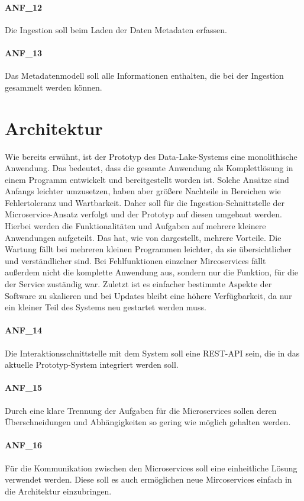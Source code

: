 \paragraph{ANF\_12}
\label{ANF_12}
Die Ingestion soll beim Laden der Daten Metadaten erfassen.

\paragraph{ANF\_13}
\label{ANF_13}
Das Metadatenmodell soll alle Informationen enthalten, die bei der Ingestion gesammelt werden können.

\section{Architektur}
\label{sec:anf-arch}
Wie bereits erwähnt, ist der Prototyp des Data-Lake-Systems eine monolithische Anwendung.
Das bedeutet, dass die gesamte Anwendung als Komplettlösung in einem Programm entwickelt und bereitgestellt worden ist.
Solche Ansätze sind Anfangs leichter umzusetzen, haben aber größere Nachteile in Bereichen wie Fehlertoleranz und Wartbarkeit.
Daher soll für die Ingestion-Schnittstelle der Microservice-Ansatz verfolgt und der Prototyp auf diesen umgebaut werden.
Hierbei werden die Funktionalitäten und Aufgaben auf mehrere kleinere Anwendungen aufgeteilt.
Das hat, wie von \textcite{microservices} dargestellt, mehrere Vorteile.
Die Wartung fällt bei mehreren kleinen Programmen leichter, da sie übersichtlicher und verständlicher sind.
Bei Fehlfunktionen einzelner Mircoservices fällt außerdem nicht die komplette Anwendung aus, sondern nur die Funktion, für die der Service zuständig war.
Zuletzt ist es einfacher bestimmte Aspekte der Software zu skalieren und bei Updates bleibt eine höhere Verfügbarkeit, da nur ein kleiner Teil des Systems neu gestartet werden muss.

\paragraph{ANF\_14}
\label{ANF_14}
Die Interaktionsschnittstelle mit dem System soll eine REST-API sein, die in das aktuelle Prototyp-System integriert werden soll.

\paragraph{ANF\_15}
\label{ANF_15}
Durch eine klare Trennung der Aufgaben für die Microservices sollen deren Überschneidungen und Abhängigkeiten so gering wie möglich gehalten werden.

\paragraph{ANF\_16}
\label{ANF_16}
Für die Kommunikation zwischen den Microservices soll eine einheitliche Lösung verwendet werden.
Diese soll es auch ermöglichen neue Mircoservices einfach in die Architektur einzubringen.

